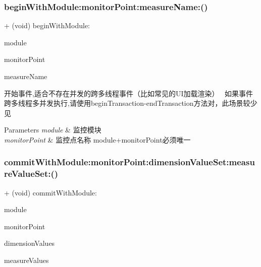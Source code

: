 \subsubsection{\texorpdfstring{begin\+With\+Module\+:monitor\+Point\+:measure\+Name\+:()}{beginWithModule:monitorPoint:measureName:()}}
{\footnotesize\ttfamily + (void) begin\+With\+Module\+: \begin{DoxyParamCaption}\item[{(N\+S\+String $\ast$)}]{module }\item[{monitorPoint:(N\+S\+String $\ast$)}]{monitor\+Point }\item[{measureName:(N\+S\+String $\ast$)}]{measure\+Name }\end{DoxyParamCaption}}

开始事件,适合不存在并发的跨多线程事件（比如常见的\+U\+I加载渲染）~\newline
 如果事件跨多线程多并发执行,请使用begin\+Transaction-\/end\+Transaction方法对，此场景较少见 
\begin{DoxyParams}{Parameters}
{\em module} & 监控模块 \\
\hline
{\em monitor\+Point} & 监控点名称 module+monitor\+Point必须唯一 \\
\hline
\end{DoxyParams}
\mbox{\label{interface_app_monitor_stat_ab0f49bd48da1dfc4764a13b2f7272955}} 
\subsubsection{\texorpdfstring{commit\+With\+Module\+:monitor\+Point\+:dimension\+Value\+Set\+:measure\+Value\+Set\+:()}{commitWithModule:monitorPoint:dimensionValueSet:measureValueSet:()}}
{\footnotesize\ttfamily + (void) commit\+With\+Module\+: \begin{DoxyParamCaption}\item[{(N\+S\+String $\ast$)}]{module }\item[{monitorPoint:(N\+S\+String $\ast$)}]{monitor\+Point }\item[{dimensionValueSet:(\mbox{\hyperlink{interface_app_monitor_dimension_value_set}{App\+Monitor\+Dimension\+Value\+Set}} $\ast$)}]{dimension\+Values }\item[{measureValueSet:(\mbox{\hyperlink{interface_app_monitor_measure_value_set}{App\+Monitor\+Measure\+Value\+Set}} $\ast$)}]{measure\+Values }\end{DoxyParamCaption}}

